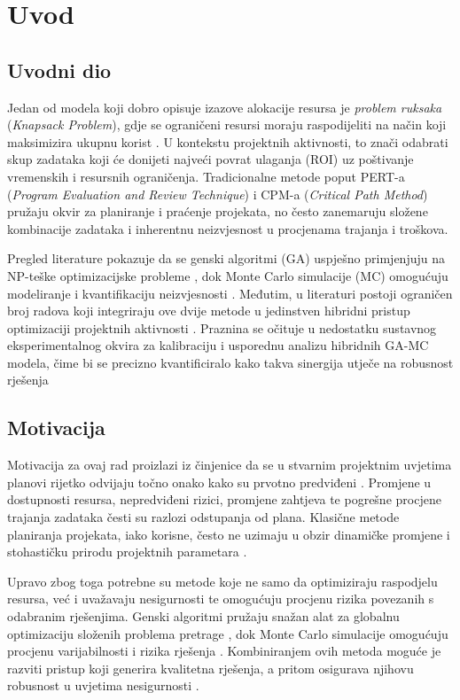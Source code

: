 \section{Uvod}

\subsection{Uvodni dio}
Jedan od modela koji dobro opisuje izazove alokacije resursa je \textit{problem ruksaka} (\textit{Knapsack Problem}), gdje se ograničeni resursi moraju raspodijeliti na način koji maksimizira ukupnu korist \cite{Kellerer2004}. U kontekstu projektnih aktivnosti, to znači odabrati skup zadataka koji će donijeti najveći povrat ulaganja (ROI) uz poštivanje vremenskih i resursnih ograničenja. Tradicionalne metode poput PERT-a (\textit{Program Evaluation and Review Technique}) i CPM-a (\textit{Critical Path Method}) \cite{Malcolm1959,Kerzner2017} pružaju okvir za planiranje i praćenje projekata, no često zanemaruju složene kombinacije zadataka i inherentnu neizvjesnost u procjenama trajanja i troškova.

Pregled literature pokazuje da se genski algoritmi (GA) uspješno primjenjuju na NP-teške optimizacijske probleme \cite{Holland1975,Goldberg1989}, dok Monte Carlo simulacije (MC) omogućuju modeliranje i kvantifikaciju neizvjesnosti \cite{Metropolis1949,Rubinstein2016}. Međutim, u literaturi postoji ograničen broj radova koji integriraju ove dvije metode u jedinstven hibridni pristup optimizaciji projektnih aktivnosti \cite{Deb2002,Zhang2011}. Praznina se očituje u nedostatku sustavnog eksperimentalnog okvira za kalibraciju i usporednu analizu hibridnih GA-MC modela, čime bi se precizno kvantificiralo kako takva sinergija utječe na robusnost rješenja
\subsection{Motivacija}
Motivacija za ovaj rad proizlazi iz činjenice da se u stvarnim projektnim uvjetima planovi rijetko odvijaju točno onako kako su prvotno predviđeni \cite{Kerzner2017}. Promjene u dostupnosti resursa, nepredviđeni rizici, promjene zahtjeva te pogrešne procjene trajanja zadataka česti su razlozi odstupanja od plana. Klasične metode planiranja projekata, iako korisne, često ne uzimaju u obzir dinamičke promjene i stohastičku prirodu projektnih parametara \cite{PMI2021}.

Upravo zbog toga potrebne su metode koje ne samo da optimiziraju raspodjelu resursa, već i uvažavaju nesigurnosti te omogućuju procjenu rizika povezanih s odabranim rješenjima. Genski algoritmi pružaju snažan alat za globalnu optimizaciju složenih problema pretrage \cite{Goldberg1989}, dok Monte Carlo simulacije omogućuju procjenu varijabilnosti i rizika rješenja \cite{Rubinstein2016}. Kombiniranjem ovih metoda moguće je razviti pristup koji generira kvalitetna rješenja, a pritom osigurava njihovu robusnost u uvjetima nesigurnosti \cite{Zhang2011}.

